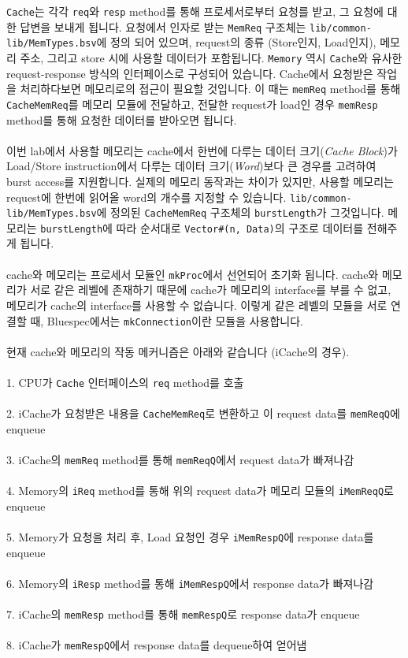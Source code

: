 \documentclass{article}
\begin{document}
\noindent\texttt{Cache}는 각각 \texttt{req}와 \texttt{resp} method를 통해 프로세서로부터 요청를 받고, 그 요청에 대한 답변을
보내게 됩니다. 요청에서 인자로 받는 \texttt{MemReq} 구조체는 \texttt{lib/common-lib/MemTypes.bsv}에 정의 되어 있으며,
request의 종류 (Store인지, Load인지), 메모리 주소, 그리고 store 시에 사용할 데이터가 포함됩니다.
\texttt{Memory} 역시 \texttt{Cache}와 유사한 request-response 방식의 인터페이스로 구성되어 있습니다.
Cache에서 요청받은 작업을 처리하다보면 메모리로의 접근이 필요할 것입니다.
이 때는 \texttt{memReq} method를 통해 \texttt{CacheMemReq}를 메모리 모듈에 전달하고, 
전달한 request가 load인 경우 \texttt{memResp} method를 통해 요청한 데이터를 받아오면 됩니다. 
\\\\
이번 lab에서 사용할 메모리는 cache에서 한번에 다루는 데이터 크기(\textit{Cache Block})가
Load/Store instruction에서 다루는 데이터 크기(\textit{Word})보다 큰 경우를 고려하여 burst access를 지원합니다.
실제의 메모리 동작과는 차이가 있지만, 사용할 메모리는 request에 한번에 읽어올 word의 개수를 지정할 수 있습니다.
\texttt{lib/common-lib/MemTypes.bsv}에 정의된 \texttt{CacheMemReq} 구조체의 \texttt{burstLength}가 그것입니다.
메모리는 \texttt{burstLength}에 따라 순서대로 \texttt{Vector\#(n, Data)}의 구조로 데이터를 전해주게 됩니다.
\\\\
cache와 메모리는 프로세서 모듈인 \texttt{mkProc}에서 선언되어 초기화 됩니다.
cache와 메모리가 서로 같은 레벨에 존재하기 때문에 cache가 메모리의 interface를 부를 수 없고,
메모리가 cache의 interface를 사용할 수 없습니다. 이렇게 같은 레벨의 모듈을 서로 연결할 때, Bluespec에서는 \texttt{mkConnection}이란 모듈을 사용합니다. 
\\\\
현재 cache와 메모리의 작동 메커니즘은 아래와 같습니다 (iCache의 경우).
\\\\
1. CPU가 \texttt{Cache} 인터페이스의 \texttt{req} method를 호출
\\\\
2. iCache가 요청받은 내용을 \texttt{CacheMemReq}로 변환하고 이 request data를 \texttt{memReqQ}에 enqueue
\\\\
3. iCache의 \texttt{memReq} method를 통해 \texttt{memReqQ}에서 request data가 빠져나감
\\\\
4. Memory의 \texttt{iReq} method를 통해 위의 request data가 메모리 모듈의 \texttt{iMemReqQ}로 enqueue
\\\\
5. Memory가 요청을 처리 후, Load 요청인 경우 \texttt{iMemRespQ}에 response data를 enqueue
\\\\
6. Memory의 \texttt{iResp} method를 통해 \texttt{iMemRespQ}에서 response data가 빠져나감
\\\\
7. iCache의 \texttt{memResp} method를 통해 \texttt{memRespQ}로 response data가 enqueue
\\\\
8. iCache가 \texttt{memRespQ}에서 response data를 dequeue하여 얻어냄
\\\\
\end{document}
